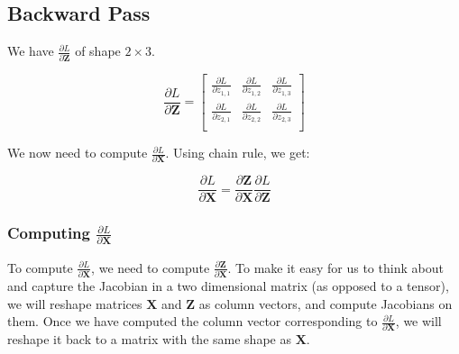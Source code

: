 \documentclass{article}
\newcommand{\matr}[1]{\mathbf{#1}} %
\begin{document}
\subsection{Backward Pass}
We have $\frac{\partial L}{\partial \matr{Z}}$ of shape $2 \times 3$.

\begin{displaymath}
\frac{\partial L}{\partial \matr{Z}} =
\begin{bmatrix}
\frac{\partial L}{\partial z_{1,1}} & \frac{\partial L}{\partial z_{1,2}} & \frac{\partial L}{\partial z_{1,3}} \\[0.5em]
\frac{\partial L}{\partial z_{2,1}} & \frac{\partial L}{\partial z_{2,2}} & \frac{\partial L}{\partial z_{2,3}} \\[0.5em]
\end{bmatrix}
\end{displaymath}

We now need to compute $\frac{\partial L}{\partial \matr{X}}$. Using chain rule, we get:

\begin{equation} \label{dX_transpose}
\frac{\partial L}{\partial \matr{X}} = \frac{\partial \matr{Z}}{\partial \matr{X}}\frac{\partial L}{\partial \matr{Z}}
\end{equation}

\subsubsection{Computing $\frac{\partial L}{\partial \matr{X}}$}
To compute $\frac{\partial L}{\partial \matr{X}}$, we need to compute $\frac{\partial \matr{Z}}{\partial \matr{X}}$. To make it easy for us to think about and capture the Jacobian in a two dimensional matrix (as opposed to a tensor), we will reshape matrices $\matr{X}$ and $\matr{Z}$ as column vectors, and compute Jacobians on them. Once we have computed the column vector corresponding to $\frac{\partial L}{\partial \matr{X}}$, we will reshape it back to a matrix with the same shape as $\matr{X}$.
\end{document}
